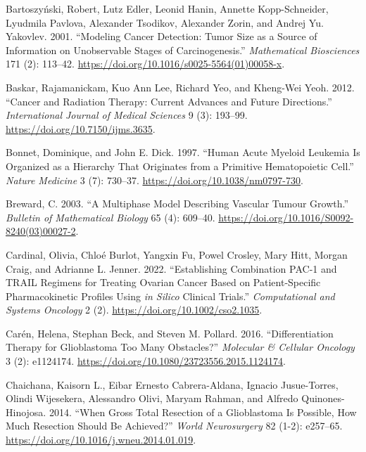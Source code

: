 \documentclass[
  letterpaper,
]{scrreprt}
\newlength{\cslhangindent}
\newenvironment{CSLReferences}[2] %
 {\begin{list}{}{%
  \setlength{\itemindent}{0pt}
  \setlength{\leftmargin}{0pt}
  \setlength{\parsep}{0pt}
  \ifodd #1
   \setlength{\leftmargin}{\cslhangindent}
   \setlength{\itemindent}{-1\cslhangindent}
  \fi
  \setlength{\itemsep}{#2\baselineskip}}}
 {\end{list}}
\theoremstyle{definition}
\theoremstyle{remark}
\begin{document}
\begin{CSLReferences}{1}{0}
Bartoszyński, Robert, Lutz Edler, Leonid Hanin, Annette Kopp-Schneider,
Lyudmila Pavlova, Alexander Tsodikov, Alexander Zorin, and Andrej Yu.
Yakovlev. 2001. {``Modeling Cancer Detection: Tumor Size as a Source of
Information on Unobservable Stages of Carcinogenesis.''}
\emph{Mathematical Biosciences} 171 (2): 113--42.
\url{https://doi.org/10.1016/s0025-5564(01)00058-x}.

Baskar, Rajamanickam, Kuo Ann Lee, Richard Yeo, and Kheng-Wei Yeoh.
2012. {``Cancer and Radiation Therapy: Current Advances and Future
Directions.''} \emph{International Journal of Medical Sciences} 9 (3):
193--99. \url{https://doi.org/10.7150/ijms.3635}.

Bonnet, Dominique, and John E. Dick. 1997. {``Human Acute Myeloid
Leukemia Is Organized as a Hierarchy That Originates from a Primitive
Hematopoietic Cell.''} \emph{Nature Medicine} 3 (7): 730--37.
\url{https://doi.org/10.1038/nm0797-730}.

Breward, C. 2003. {``A Multiphase Model Describing Vascular Tumour
Growth.''} \emph{Bulletin of Mathematical Biology} 65 (4): 609--40.
\url{https://doi.org/10.1016/S0092-8240(03)00027-2}.

Cardinal, Olivia, Chloé Burlot, Yangxin Fu, Powel Crosley, Mary Hitt,
Morgan Craig, and Adrianne L. Jenner. 2022. {``Establishing Combination
PAC{-}1 and TRAIL Regimens for Treating Ovarian Cancer Based on
Patient{-}Specific Pharmacokinetic Profiles Using {\emph{in Silico}}
Clinical Trials.''} \emph{Computational and Systems Oncology} 2 (2).
\url{https://doi.org/10.1002/cso2.1035}.

Carén, Helena, Stephan Beck, and Steven M. Pollard. 2016.
{``Differentiation Therapy for Glioblastoma {\textendash} Too Many
Obstacles?''} \emph{Molecular \& Cellular Oncology} 3 (2): e1124174.
\url{https://doi.org/10.1080/23723556.2015.1124174}.

Chaichana, Kaisorn L., Eibar Ernesto Cabrera-Aldana, Ignacio
Jusue-Torres, Olindi Wijesekera, Alessandro Olivi, Maryam Rahman, and
Alfredo Quinones-Hinojosa. 2014. {``When Gross Total Resection of a
Glioblastoma Is Possible, How Much Resection Should Be Achieved?''}
\emph{World Neurosurgery} 82 (1-2): e257--65.
\url{https://doi.org/10.1016/j.wneu.2014.01.019}.


\end{CSLReferences}
\end{document}
